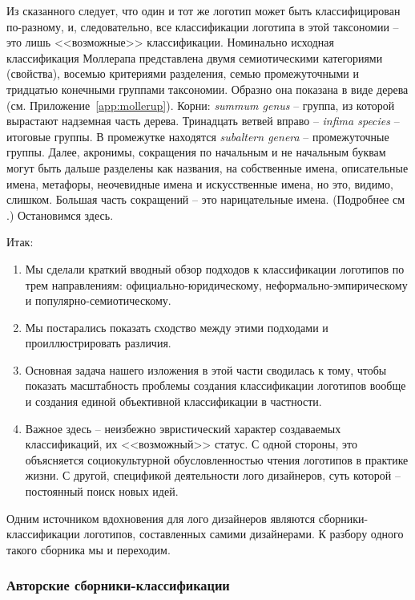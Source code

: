 Из сказанного следует, что один и тот же логотип может быть классифицирован по-разному, и,
следовательно, все классификации логотипа в этой таксономии -- это лишь <<возможные>>
классификации. Номинально исходная классификация Моллерапа представлена двумя семиотическими
категориями (свойства), восемью критериями разделения, семью промежуточными и тридцатью конечными
группами таксономии. Образно она показана в виде дерева (см. Приложение~\ref{app:mollerup}). Корни: \emph{summum genus} -- группа, из которой вырастают надземная
часть дерева. Тринадцать ветвей вправо -- \emph{infima species} -- итоговые группы. В промежутке
находятся \emph{subaltern genera} -- промежуточные группы. Далее, акронимы, сокращения по начальным
и не начальным буквам могут быть дальше разделены как названия, на собственные имена, описательные
имена, метафоры, неочевидные имена и искусственные имена, но это, видимо, слишком. Большая часть
сокращений -- это нарицательные имена. (Подробнее см \autocite[][98-123]{mollerup1999marks}.)
Остановимся здесь.

Итак:
\begin{enumerate}
\item Мы сделали краткий вводный обзор подходов к классификации логотипов по трем направлениям:
  официально-юридическому, неформально-эмпирическому и популярно-семиотическому.
\item Мы постарались показать сходство между этими подходами и проиллюстрировать различия.
\item Основная задача нашего изложения в этой части сводилась к тому, чтобы показать масштабность
  проблемы создания классификации логотипов вообще и создания единой объективной классификации в
  частности.
\item Важное здесь -- неизбежно эвристический характер создаваемых классификаций, их <<возможный>>
  статус. С одной стороны, это объясняется социокультурной обусловленностью чтения логотипов в
  практике жизни. С другой, спецификой деятельности лого дизайнеров, суть которой -- постоянный поиск
  новых идей.
\end{enumerate}

Одним источником вдохновения для лого дизайнеров являются сборники-классификации логотипов,
составленных самими дизайнерами. К разбору одного такого сборника мы и переходим.

\subsubsection{Авторские сборники-классификации}
\label{2.2}

